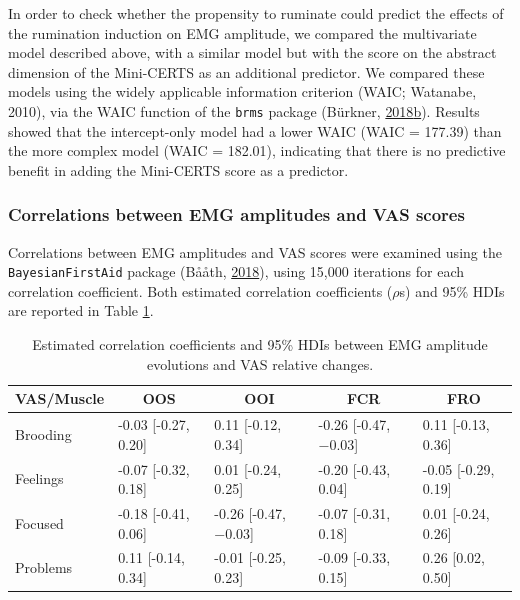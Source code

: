 \documentclass[a4paper,12pt,twoside,onecolumn,openright,final,oldfontcommands]{memoir}
\begin{document}
In order to check whether the propensity to ruminate could predict the effects of the rumination induction on EMG amplitude, we compared the multivariate model described above, with a similar model but with the score on the abstract dimension of the Mini-CERTS as an additional predictor. We compared these models using the widely applicable information criterion (WAIC; Watanabe, 2010), via the WAIC function of the \texttt{brms} package (Bürkner, \protect\hyperlink{ref-R-brms}{2018}\protect\hyperlink{ref-R-brms}{b}). Results showed that the intercept-only model had a lower WAIC (WAIC = 177.39) than the more complex model (WAIC = 182.01), indicating that there is no predictive benefit in adding the Mini-CERTS score as a predictor.

\hypertarget{correlations-between-emg-amplitudes-and-vas-scores}{%
\subsubsection{Correlations between EMG amplitudes and VAS scores}\label{correlations-between-emg-amplitudes-and-vas-scores}}

Correlations between EMG amplitudes and VAS scores were examined using the \texttt{BayesianFirstAid} package (Bååth, \protect\hyperlink{ref-R-BayesianFirstAid}{2018}), using 15,000 iterations for each correlation coefficient. Both estimated correlation coefficients (\(\rho\)s) and 95\% HDIs are reported in Table \ref{tab:table1}.

\begin{table}[H]
\begin{center}
\begin{threeparttable}
\caption{\label{tab:table1}Estimated correlation coefficients and 95\% HDIs between EMG amplitude evolutions and VAS relative changes.}
\small{
\begin{tabular}{lllll}
\toprule
VAS/Muscle & \multicolumn{1}{c}{OOS} & \multicolumn{1}{c}{OOI} & \multicolumn{1}{c}{FCR} & \multicolumn{1}{c}{FRO}\\
\midrule
Brooding & -0.03 [-0.27, 0.20] & 0.11 [-0.12, 0.34] & -0.26 [-0.47, −0.03] & 0.11 [-0.13, 0.36]\\
Feelings & -0.07 [-0.32, 0.18] & 0.01 [-0.24, 0.25] & -0.20 [-0.43, 0.04] & -0.05 [-0.29, 0.19]\\
Focused & -0.18 [-0.41, 0.06] & -0.26 [-0.47, −0.03] & -0.07 [-0.31, 0.18] & 0.01 [-0.24, 0.26]\\
Problems & 0.11 [-0.14, 0.34] & -0.01 [-0.25, 0.23] & -0.09 [-0.33, 0.15] & 0.26 [0.02, 0.50]\\
\bottomrule
\end{tabular}
}
\end{threeparttable}
\end{center}
\end{table}
\end{document}
